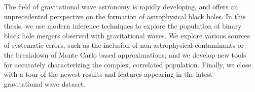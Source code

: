 %
%

The field of gravitational wave astronomy is rapidly developing, and offers an unprecedented perspective on the formation of astrophysical black holes. In this thesis, we use modern inference techniques to explore the population of binary black hole mergers observed with gravitational waves. We explore various sources of systematic errors, such as the inclusion of non-astrophysical contaminants or the breakdown of Monte Carlo based approximations, and we develop new tools for accurately characterizing the complex, correlated population. Finally, we close with a tour of the newest results and features appearing in the latest gravitational wave dataset.